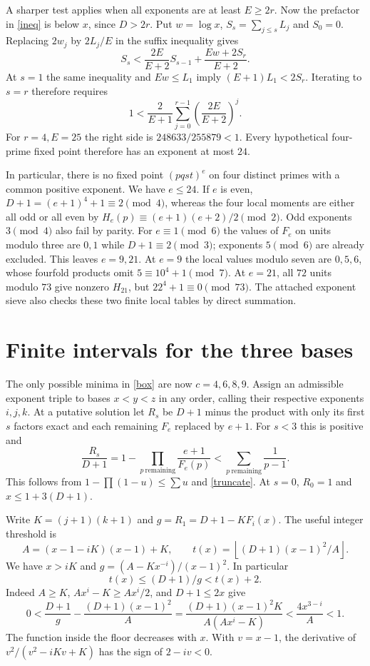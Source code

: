 \documentclass[11pt]{article}
\newcommand{\fl}[1]{\left\lfloor #1\right\rfloor}
\begin{document}
A sharper test applies when all exponents are at least $E\ge2r$. Now the prefactor in \eqref{ineq} is below $x$, since $D>2r$. Put $w=\log x$, $S_s=\sum_{j\le s}L_j$ and $S_0=0$. Replacing $2w_j$ by $2L_j/E$ in the suffix inequality gives
\[
 S_s<\frac{2E}{E+2} S_{s-1}+\frac{Ew+2S_r}{E+2}.
\]
At $s=1$ the same inequality and $Ew\le L_1$ imply $(E+1)L_1<2S_r$. Iterating to $s=r$ therefore requires
\begin{equation}
 1<\frac{2}{E+1}\sum_{j=0}^{r-1}\left(\frac{2E}{E+2}\right)^j .\label{four}
\end{equation}
For $r=4,E=25$ the right side is $248633/255879<1$. Every hypothetical four-prime fixed point therefore has an exponent at most $24$.

In particular, there is no fixed point $(pqst)^e$ on four distinct primes with a common positive exponent. We have $e\le24$. If $e$ is even, $D+1=(e+1)^4+1\equiv2\pmod4$, whereas the four local moments are either all odd or all even by $H_e(p)\equiv(e+1)(e+2)/2\pmod2$. Odd exponents $3\pmod4$ also fail by parity. For $e\equiv1\pmod6$ the values of $F_e$ on units modulo three are $0,1$ while $D+1\equiv2\pmod3$; exponents $5\pmod6$ are already excluded. This leaves $e=9,21$. At $e=9$ the local values modulo seven are $0,5,6$, whose fourfold products omit $5\equiv10^4+1\pmod7$. At $e=21$, all $72$ units modulo $73$ give nonzero $H_{21}$, but $22^4+1\equiv0\pmod{73}$. The attached exponent sieve also checks these two finite local tables by direct summation.


\section{Finite intervals for the three bases}
The only possible minima in \eqref{box} are now $c=4,6,8,9$. Assign an admissible exponent triple to bases $x<y<z$ in any order, calling their respective exponents $i,j,k$. At a putative solution let $R_s$ be $D+1$ minus the product with only its first $s$ factors exact and each remaining $F_e$ replaced by $e+1$. For $s<3$ this is positive and
\begin{equation}
 \frac{R_s}{D+1}=1-\prod_{p\ \mathrm{remaining}}\frac{e+1}{F_e(p)}
 <\sum_{p\ \mathrm{remaining}}\frac1{p-1}.\label{res}
\end{equation}
This follows from $1-\prod(1-u)\le\sum u$ and \eqref{truncate}. At $s=0$, $R_0=1$ and $x\le1+3(D+1)$.

Write $K=(j+1)(k+1)$ and $g=R_1=D+1-KF_i(x)$. The useful integer threshold is
\[
 A=(x-1-iK)(x-1)+K,\qquad t(x)=\fl{(D+1)(x-1)^2/A}.
\]
We have $x>iK$ and $g=(A-Kx^{-i})/(x-1)^2$. In particular
\begin{equation}
 t(x)\le (D+1)/g < t(x)+2.\label{approx}
\end{equation}
Indeed $A\ge K$, $Ax^i-K\ge Ax^i/2$, and $D+1\le2x$ give
\[
 0<\frac{D+1}{g}-\frac{(D+1)(x-1)^2}{A}
 =\frac{(D+1)(x-1)^2K}{A(Ax^i-K)}<\frac{4x^{3-i}}A<1.
\]
The function inside the floor decreases with $x$. With $v=x-1$, the derivative of $v^2/(v^2-iKv+K)$ has the sign of $2-iv<0$.
\end{document}

